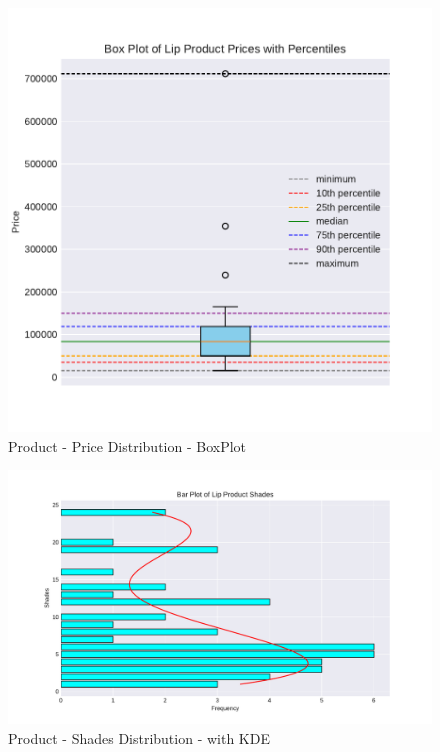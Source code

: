 \documentclass{article}
\begin{document}
\begin{center}
    \begin{figure}[htbp]
        \centering
        \includegraphics[scale=0.6]{../images/Indonesia-graphs/Box_Prices.pdf}
        \caption{Product - Price Distribution - BoxPlot}
        \label{Box_Prices}
    \end{figure}

    \begin{figure}[htbp]
        \centering
        \includegraphics[scale=0.6]{../images/Indonesia-graphs/KDE_Shades.pdf}
        \caption{Product - Shades Distribution - with KDE}
        \label{KDE_Shades}
    \end{figure}
    \restoregeometry

\end{center}
\restoregeometry
\end{document}
